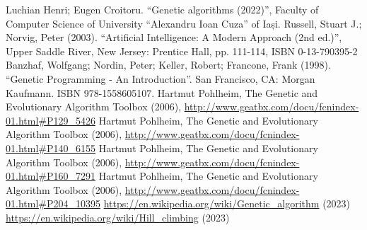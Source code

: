 \documentclass[conference]{IEEEtran}
\begin{document}
\begin{thebibliography}{00}
 Luchian Henri; Eugen Croitoru. ``Genetic algorithms (2022)'', Faculty of Computer Science of University ``Alexandru Ioan Cuza'' of Iași.
 Russell, Stuart J.; Norvig, Peter (2003). ``Artificial Intelligence: A Modern Approach (2nd ed.)'', Upper Saddle River, New Jersey: Prentice Hall, pp. 111-114, ISBN 0-13-790395-2 
 Banzhaf, Wolfgang; Nordin, Peter; Keller, Robert; Francone, Frank (1998). ``Genetic Programming - An Introduction''. San Francisco, CA: Morgan Kaufmann. ISBN 978-1558605107.
 Hartmut Pohlheim, The Genetic and Evolutionary Algorithm Toolbox (2006), \url{http://www.geatbx.com/docu/fcnindex-01.html#P129_5426}
 Hartmut Pohlheim, The Genetic and Evolutionary Algorithm Toolbox (2006), \url{http://www.geatbx.com/docu/fcnindex-01.html#P140_6155}
 Hartmut Pohlheim, The Genetic and Evolutionary Algorithm Toolbox (2006), \url{http://www.geatbx.com/docu/fcnindex-01.html#P160_7291}
 Hartmut Pohlheim, The Genetic and Evolutionary Algorithm Toolbox (2006), \url{http://www.geatbx.com/docu/fcnindex-01.html#P204_10395}
 \url{https://en.wikipedia.org/wiki/Genetic_algorithm} (2023)
 \url{https://en.wikipedia.org/wiki/Hill_climbing} (2023)
\end{thebibliography}
\end{document}
